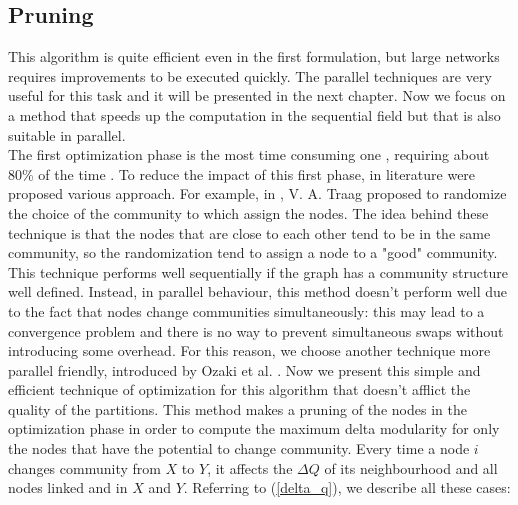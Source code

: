 \subsection{Pruning}\label{prun}
This algorithm is quite efficient even in the first formulation, but large networks requires improvements to be executed quickly. The parallel techniques are very useful for this task and it will be presented in the next chapter. Now we focus on a method that speeds up the computation in the sequential field but that is also suitable in parallel.\\
The first optimization phase is the most time consuming one \cite{Blondel_2008}, requiring about 80\% of the time \cite{wickramaarachchi2014fast}. To reduce the impact of this first phase, in literature were proposed various approach. For example, in \cite{rand}, V. A. Traag proposed to randomize the choice of the community to which assign the nodes. The idea behind these technique is that the nodes that are close to each other tend to be in the same community, so the randomization tend to assign a node to a "good" community. This technique performs well sequentially if the graph has a community structure well defined. Instead, in parallel behaviour, this method doesn't perform well due to the fact that nodes change communities simultaneously: this may lead to a convergence problem and there is no way to prevent simultaneous swaps without introducing some overhead. For this reason, we choose another technique more parallel friendly, introduced by Ozaki et al. \cite{pruning}. Now we present this simple and efficient technique of optimization for this algorithm that doesn't afflict the quality of the partitions. This method makes a pruning of the nodes in the optimization phase in order to compute the maximum delta modularity for only the nodes that have the potential to change community.
Every time a node $i$ changes community from $X$ to $Y$, it affects the $\Delta Q$ of its neighbourhood and all nodes linked and in $X$ and $Y$. Referring to (\ref{delta_q}), we describe all these cases:
